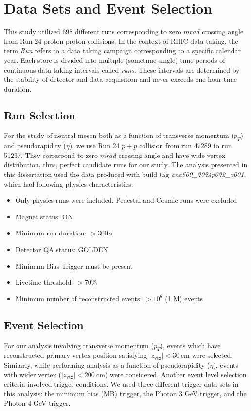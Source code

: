
\section{Data Sets and Event Selection}

This study utilized 698 different runs corresponding to zero $mrad$ crossing angle from Run 24 proton-proton collisions. In the context of \ac{RHIC} data taking, the term \textit{Run} refers to a data taking campaign corresponding to a specific calendar year. Each store is divided into multiple (sometime single) time periods of continuous data taking intervals called \textit{runs}. These intervals are determined by the stability of detector and data acquisition and never exceeds one hour time duration.

\subsection{Run Selection}
For the study of neutral meson both as a function of transverse momentum ($p_T$) and pseudorapidity ($\eta$), we use Run 24 $p+p$ collision from run 47289 to run 51237. They correspond to zero $mrad$ crossing angle and have wide vertex distribution, thus, perfect candidate runs for our study. The analysis presented in this dissertation used the data produced with build tag \textit{ana509\_2024p022\_v001}, which had following physics characteristics:

\begin{itemize}
    \item Only physics runs were included. Pedestal and Cosmic runs were excluded
    \item Magnet status: ON 
    \item Minimum run duration: $> 300~\mathrm{s}$
    \item Detector QA status: GOLDEN
    \item Minimum Bias Trigger must be present
    \item Livetime threshold: $> 70\%$
    \item Minimum number of reconstructed events: $> 10^{6}$ (1 M) events
\end{itemize}


\subsection{Event Selection}

For our analysis involving transverse momentum ($p_T$), events which have reconstructed primary vertex position satisfying $|z_{\mathrm{vtx}}| < 30~\mathrm{cm}$ were selected. Similarly, while performing analysis as a function of pseudorapidity ($\eta$), events with wider vertex ($|z_{\mathrm{vtx}}| < 200~\mathrm{cm}$) were considered. Another event level selection criteria involved trigger conditions. We used three different trigger data sets in this analysis: the minimum bias (MB) trigger, the Photon 3 GeV trigger, and the Photon 4 GeV trigger.



